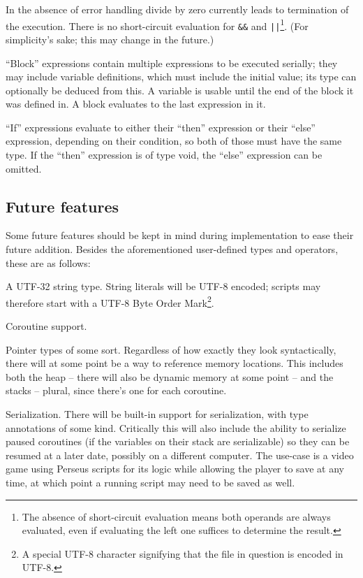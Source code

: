 			In the absence of error handling divide by zero currently leads to termination of the execution. There is no short-circuit evaluation for \lstinline$&&$ and \lstinline$||$\footnote{The absence of short-circuit evaluation means both operands are always evaluated, even if evaluating the left one suffices to determine the result.}. (For simplicity's sake; this may change in the future.)
			
			``Block'' expressions contain multiple expressions to be executed serially; they may include variable definitions, which must include the initial value; its type can optionally be deduced from this. A variable is usable until the end of the block it was defined in. A block evaluates to the last expression in it.
			
			``If'' expressions evaluate to either their ``then'' expression or their ``else'' expression, depending on their condition, so both of those must have the same type. If the ``then'' expression is of type void, the ``else'' expression can be omitted.
        
        \subsection{Future features}
        	
        	Some future features should be kept in mind during implementation to ease their future addition. Besides the aforementioned user-defined types and operators, these are as follows:
        	
        	A UTF-32 string type. String literals will be UTF-8 encoded; scripts may therefore start with a UTF-8 Byte Order Mark\footnote{A special UTF-8 character signifying that the file in question is encoded in UTF-8.}.
        	
        	Coroutine support.
        	
        	
        	Pointer types of some sort. Regardless of how exactly they look syntactically, there will at some point be a way to reference memory locations. This includes both the heap -- there will also be dynamic memory at some point -- and the stacks -- plural, since there's one for each coroutine.
        	
        	Serialization. There will be built-in support for serialization, with type annotations of some kind. Critically this will also include the ability to serialize paused coroutines (if the variables on their stack are serializable) so they can be resumed at a later date, possibly on a different computer. The use-case is a video game using Perseus scripts for its logic while allowing the player to save at any time, at which point a running script may need to be saved as well.
            
